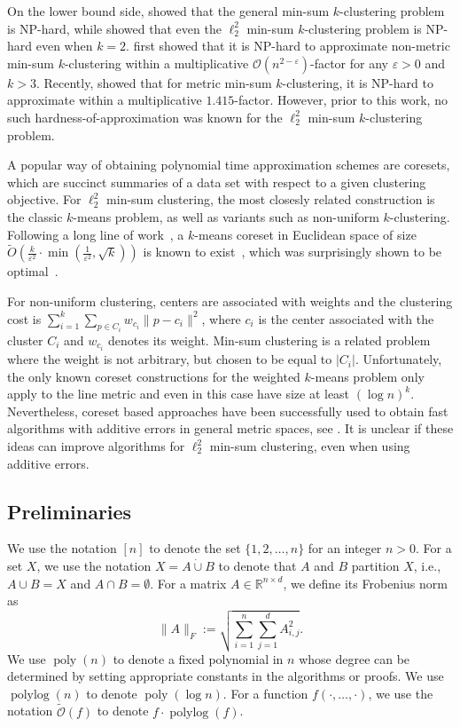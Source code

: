 \documentclass[11pt]{article}
\renewcommand{\O}[1]{\ensuremath{\mathcal{O}\left(#1\right)}}
\newcommand{\tO}[1]{\ensuremath{\tilde{\mathcal{O}}\left(#1\right)}}
\newcommand{\eps}{\varepsilon}
\DeclareMathOperator*{\polylog}{polylog}
\DeclareMathOperator*{\poly}{poly}
\begin{document}
On the lower bound side,  \cite{Guttmann-BeckH98a} showed that the general min-sum $k$-clustering problem is NP-hard, while \cite{AloiseDHP09} showed that even the $\ell_2^2$ min-sum $k$-clustering problem is NP-hard even when $k=2$. 
\cite{KannKLP97} first showed that it is NP-hard to approximate non-metric min-sum $k$-clustering within a multiplicative $\O{n^{2-\eps}}$-factor for any $\eps>0$ and $k>3$. 
Recently, \cite{Cohen-AddadSL21} showed that for metric min-sum $k$-clustering, it is NP-hard to approximate within a multiplicative $1.415$-factor. 
However, prior to this work, no such hardness-of-approximation was known for the $\ell_2^2$ min-sum $k$-clustering problem. 

A popular way of obtaining polynomial time approximation schemes are coresets, which are succinct summaries of a data set with respect to a given clustering objective.
For $\ell_2^2$ min-sum clustering, the most closesly related construction is the classic $k$-means problem, as well as variants such as non-uniform $k$-clustering.
Following a long line of work~\cite{BecchettiBC0S19,FeldmanSS20,HuangV20,Cohen-AddadWZ23,WoodruffZZ23}, a $k$-means coreset in Euclidean space of size $\tilde{O}(\frac{k}{\eps^2}\cdot\min\left(\frac{1}{\eps^2},\sqrt{k}\right))$ is known to exist~\cite{Cohen-AddadSS21,Cohen-AddadLSSS22,BansalCPSS24}, which was surprisingly shown to be optimal~\cite{HuangLW24,ZhuTHH24}.

For non-uniform clustering, centers are associated with weights and the clustering cost is $\sum_{i=1}^k \sum_{p\in C_i} w_{c_i}\|p-c_i\|^2$, where $c_i$ is the center associated with the cluster $C_i$ and $w_{c_i}$ denotes its weight. Min-sum clustering is a related problem where the weight is not arbitrary, but chosen to be equal to $|C_i|$. Unfortunately, the only known coreset constructions for the weighted $k$-means problem \cite{FeldmanS12} only apply to the line metric and even in this case have size at least $(\log n)^k$.
Nevertheless, coreset based approaches have been successfully used to obtain fast algorithms with additive errors in general metric spaces, see \cite{CzumajS07}. It is unclear if these ideas can improve algorithms for $\ell_2^2$ min-sum clustering, even when using additive errors.

\subsection{Preliminaries}
We use the notation $[n]$ to denote the set $\{1,2,\ldots,n\}$ for an integer $n>0$. 
For a set $X$, we use the notation $X=A\dot\cup B$ to denote that $A$ and $B$ partition $X$, i.e., $A\cup B=X$ and $A\cap B=\emptyset$. 
For a matrix $A\in\mathbb{R}^{n\times d}$, we define its Frobenius norm as
\[\|A\|_F:=\sqrt{\sum_{i=1}^n\sum_{j=1}^d A_{i,j}^2}.\]
We use $\poly(n)$ to denote a fixed polynomial in $n$ whose degree can be determined by setting appropriate constants in the algorithms or proofs. 
We use $\polylog(n)$ to denote $\poly(\log n)$. 
For a function $f(\cdot,\ldots,\cdot)$, we use the notation $\tO{f}$ to denote $f\cdot\polylog(f)$. 
\end{document}
